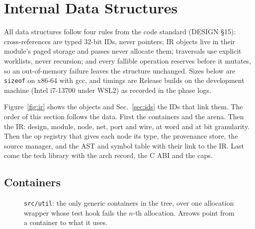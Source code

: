 \documentclass[conference]{IEEEtran}
\newcommand{\code}[1]{\texttt{#1}}
\begin{document}
\section{Internal Data Structures}
\label{sec:data}

All data structures follow four rules from the code standard (DESIGN \S15): cross-references
are typed 32-bit IDs, never pointers; IR objects live in their module's paged storage and passes
never allocate them; traversals use explicit worklists, never recursion; and every fallible
operation reserves before it mutates, so an out-of-memory failure leaves the structure
unchanged. Sizes below are \code{sizeof} on x86-64 with gcc, and timings are Release builds on
the development machine (Intel i7-13700 under WSL2) as recorded in the phase logs.

Figure~\ref{fig:ir} shows the objects and Sec.~\ref{sec:ids} the IDs that link them. The order of
this section follows the data. First the containers and the arena. Then the IR: design, module,
node, net, port and wire, at word and at bit granularity. Then the op registry that gives each
node its type, the provenance store, the source manager, and the AST and symbol table with their
link to the IR. Last come the tech library with the arch record, the C ABI and the caps.

\subsection{Containers}

\begin{figure}[t]
\centering
\odinfit{\columnwidth}{}
\caption{\code{src/util}: the only generic containers in the tree, over one allocation wrapper
whose test hook fails the $n$-th allocation. Arrows point from a container to what it uses.}
\label{fig:util}
\end{figure}
\end{document}
